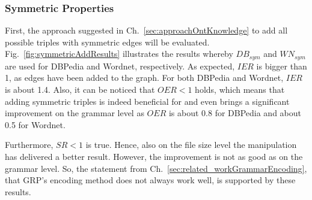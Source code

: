 \clearpage
\subsubsection{Symmetric Properties}

First, the approach suggested in Ch.~\ref{sec:approachOntKnowledge} to add all possible triples with symmetric edges will be evaluated. Fig.~\ref{fig:symmetricAddResults} illustrates the results whereby $DB_{sym}$ and $WN_{sym}$ are used for DBPedia and Wordnet, respectively. As expected, $IER$ is bigger than 1, as edges have been added to the graph. For both DBPedia and Wordnet, $IER$ is about 1.4. Also, it can be noticed that $OER<1$ holds, which means that adding symmetric triples is indeed beneficial for \GGRP{} and even brings a significant improvement on the grammar level as $OER$ is about 0.8 for DBPedia and about 0.5 for Wordnet.

Furthermore, $SR<1$ is true. Hence, also on the file size level the manipulation has delivered a better result. However, the improvement is not as good as on the grammar level. So, the statement from Ch.~\ref{sec:related_workGrammarEncoding}, that GRP's encoding method does not always work well, is supported by these results. 

